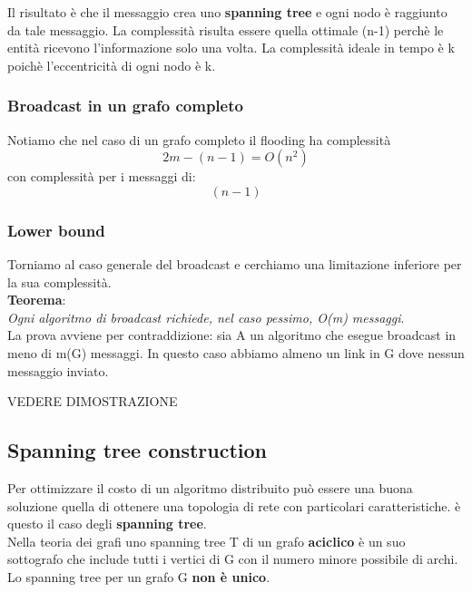 \documentclass[12pt]{article}
\begin{document}
			Il risultato è che il messaggio crea uno \textbf{spanning tree} e ogni nodo è raggiunto da tale messaggio. La complessità risulta essere quella ottimale (n-1) perchè le entità ricevono l'informazione solo una volta. La complessità ideale in tempo è k poichè l'eccentricità di ogni nodo è k.
		\subsubsection{Broadcast in un grafo completo}
			Notiamo che nel caso di un grafo completo il flooding ha complessità 
			$$2m-(n-1)=O(n^{2}) $$ con complessità per i messaggi di:
			$$(n-1) $$
		\subsubsection{Lower bound}
			Torniamo al caso generale del broadcast e cerchiamo una limitazione inferiore per la sua complessità.\\ \textbf{Teorema}:\\
			\textit{Ogni algoritmo di broadcast richiede, nel caso pessimo, O(m) messaggi}.\\
			La prova avviene per contraddizione: sia A un algoritmo che esegue broadcast in meno di m(G) messaggi. In questo caso abbiamo almeno un link in G dove nessun messaggio inviato.
			
			VEDERE DIMOSTRAZIONE
			
	\subsection{Spanning tree construction}
		Per ottimizzare il costo di un algoritmo distribuito può essere una buona soluzione quella di ottenere una topologia di rete con particolari caratteristiche. è questo il caso degli \textbf{spanning tree}.\\
		Nella teoria dei grafi uno spanning tree T di un grafo \textbf{aciclico} è un suo sottografo che include tutti i vertici di G con il numero minore possibile di archi. Lo spanning tree per un grafo G \textbf{non è unico}.
\end{document}
